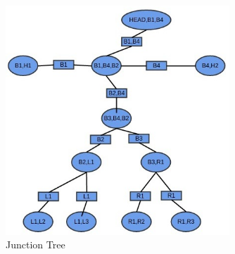 \clearpage
\begin{figure}[ht]
    \centering
    \includegraphics[width=0.75\textwidth]{figures/ml5JT.jpg}
    \caption{Junction Tree}
\end{figure}
